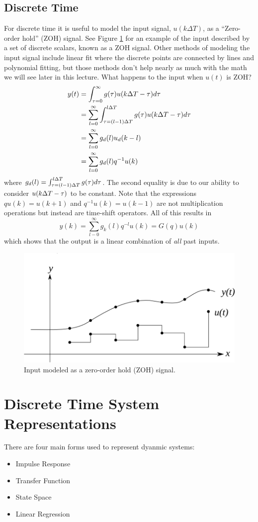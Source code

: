 \documentclass[lecture,12pt,]{pcms-l}
\begin{document}
\subsection{Discrete Time}
For discrete time it is useful to model the input signal, $u(k\Delta T)$, as a ``Zero-order hold'' (ZOH) signal. See Figure \ref{fig:03zoh} for an example of the input described by a set of discrete scalars, known as a ZOH signal. Other methods of modeling the input signal include linear fit where the discrete points are connected by lines and polynomial fitting, but those methods don't help nearly as much with the math we will see later in this lecture. What happens to the input when $u(t)$ is ZOH?
\begin{align*}
y(t) &= \int_{\tau=0}^\infty g(\tau)u(k\Delta T -\tau)d\tau \\
&= \sum_{l=0}^\infty \int_{\tau=(l-1)\Delta T}^{l\Delta T}g(\tau)u(k\Delta T -\tau)d\tau \\
&= \sum_{l=0}^\infty g_d(l)u_d(k-l) \\
&= \sum_{l=0}^\infty g_d(l)q^{-1}u(k)
\end{align*}
where $g_d(l)=\int_{\tau=(l-1)\Delta T}^{l\Delta T}g(\tau)d\tau$. The second equality is due to our ability to consider $u(k\Delta T -\tau)$ to be constant. Note that the expressions $qu(k) = u(k+1)$ and $q^{-1}u(k)=u(k-1)$ are not multiplication operations but instead are time-shift operators. All of this results in
$$y(k) = \sum_{l-0}^\infty g_k(l)q^{-l}u(k) = G(q)u(k)$$
which shows that the output is a linear combination of \textit{all} past inputs.
\begin{figure}[ht!]
	\centering
	\includegraphics[width=.5\textwidth]{images/03zoh}
	\caption{Input modeled as a zero-order hold (ZOH) signal.}
	\label{fig:03zoh}
\end{figure}

\section{Discrete Time System Representations}
There are four main forms used to represent dyanmic systems:
\begin{itemize}
\item Impulse Response
\item Transfer Function
\item State Space
\item Linear Regression
\end{itemize}
\end{document}
